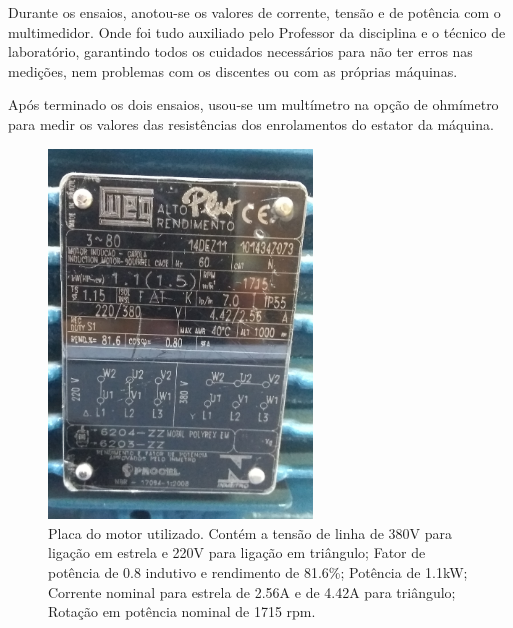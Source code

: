 Durante os ensaios, anotou-se os valores de corrente, tensão e de potência com o multimedidor. Onde foi tudo auxiliado pelo Professor da disciplina e o técnico de laboratório, garantindo todos os cuidados necessários para não ter erros nas medições, nem problemas com os discentes ou com as próprias máquinas.

Após terminado os dois ensaios, usou-se um multímetro na opção de ohmímetro para medir os valores das resistências dos enrolamentos do estator da máquina.



\begin{figure}[h!]
\centering
    \includegraphics[width=7cm]{images/placa.jpg}  
\caption{Placa do motor utilizado. Contém a tensão de linha de 380V para ligação em estrela e 220V para ligação em triângulo; Fator de potência de 0.8 indutivo e rendimento de 81.6\%; Potência de 1.1kW; Corrente nominal para estrela de 2.56A e de 4.42A para triângulo; Rotação em potência nominal de 1715 rpm.}
\label{placa} 
\end{figure}



\pagebreak
